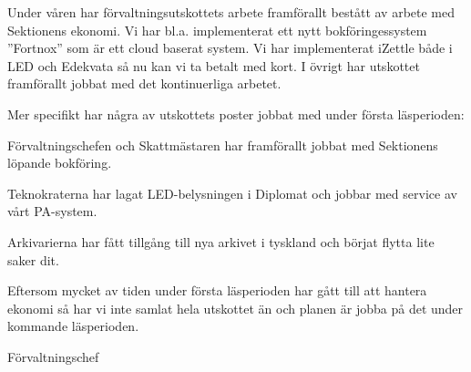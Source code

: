 \documentclass[../_main/handlingar.tex]{subfiles}
\begin{document}

Under våren har förvaltningsutskottets arbete framförallt bestått av arbete med Sektionens ekonomi. Vi har bl.a. implementerat ett nytt bokföringessystem ”Fortnox” som är ett cloud baserat system. Vi har implementerat iZettle både i LED och Edekvata så nu kan vi ta betalt med kort. I övrigt har utskottet framförallt jobbat med det kontinuerliga arbetet.

Mer specifikt har några av utskottets poster jobbat med under första läsperioden:
\begin{dashlist}
\item Förvaltningschefen och Skattmästaren har framförallt jobbat med Sektionens löpande bokföring.
\item Teknokraterna har lagat LED-belysningen i Diplomat och jobbar med service av vårt PA-system.
\item Arkivarierna har fått tillgång till nya arkivet i tyskland och börjat flytta lite saker dit.
\end{dashlist}

Eftersom mycket av tiden under första läsperioden har gått till att hantera ekonomi så har vi inte samlat hela utskottet än och planen är jobba på det under kommande läsperioden.


\begin{signatures}{1}
    \mvh
    \signature{Anders Nilsson}{Förvaltningschef}
\end{signatures}
\end{document}
